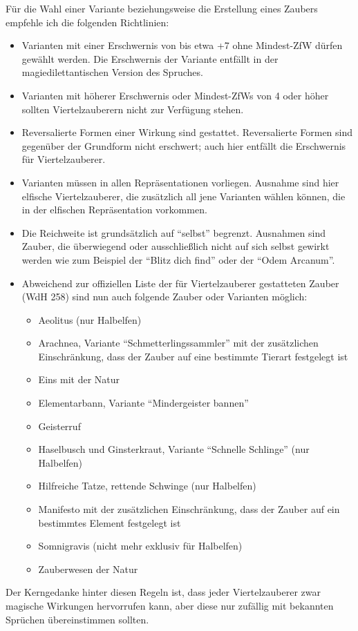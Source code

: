 Für die Wahl einer Variante beziehungsweise die Erstellung eines Zaubers empfehle ich die folgenden Richtlinien:
\begin{itemize}
	\item Varianten mit einer Erschwernis von bis etwa +7 ohne Mindest-ZfW dürfen gewählt werden. Die Erschwernis der Variante entfällt in der magiedilettantischen Version des Spruches.
	\item Varianten mit höherer Erschwernis oder Mindest-ZfWs von 4 oder höher sollten Viertelzauberern nicht zur Verfügung stehen.
	\item Reversalierte Formen einer Wirkung sind gestattet. Reversalierte Formen sind gegenüber der Grundform nicht erschwert; auch hier entfällt die Erschwernis für Viertelzauberer.
	\item Varianten müssen in allen Repräsentationen vorliegen. Ausnahme sind hier elfische Viertelzauberer, die zusätzlich all jene Varianten wählen können, die in der elfischen Repräsentation vorkommen.
	\item Die Reichweite ist grundsätzlich auf \enquote{selbst} begrenzt. Ausnahmen sind Zauber, die überwiegend oder ausschließlich nicht auf sich selbst gewirkt werden wie zum Beispiel der \enquote{Blitz dich find} oder der \enquote{Odem Arcanum}.
	\item Abweichend zur offiziellen Liste der für Viertelzauberer gestatteten Zauber (WdH 258) sind nun auch folgende Zauber oder Varianten möglich:
\begin{itemize}
	\item Aeolitus (nur Halbelfen)
	\item Arachnea, Variante \enquote{Schmetterlingssammler} mit der zusätzlichen Einschränkung, dass der Zauber auf eine bestimmte Tierart festgelegt ist
	\item Eins mit der Natur
	\item Elementarbann, Variante \enquote{Mindergeister bannen}
	\item Geisterruf
	\item Haselbusch und Ginsterkraut, Variante \enquote{Schnelle Schlinge} (nur Halbelfen)
	\item Hilfreiche Tatze, rettende Schwinge (nur Halbelfen)
	\item Manifesto mit der zusätzlichen Einschränkung, dass der Zauber auf ein bestimmtes Element festgelegt ist
	\item Somnigravis (nicht mehr exklusiv für Halbelfen)
	\item Zauberwesen der Natur
\end{itemize}

\end{itemize}
Der Kerngedanke hinter diesen Regeln ist, dass jeder Viertelzauberer zwar magische Wirkungen hervorrufen kann, aber diese nur zufällig mit bekannten Sprüchen übereinstimmen sollten.

